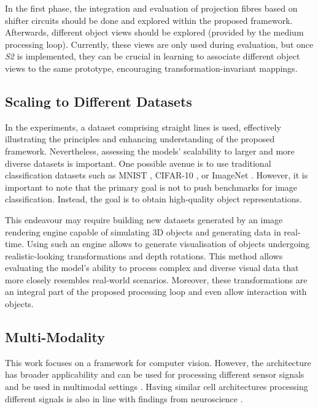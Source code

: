 In the first phase, the integration and evaluation of projection fibres based on shifter circuits \cite{anderson_shifter_1987, olshausen_neurobiological_1993} should be done and explored within the proposed framework.
Afterwards, different object views should be explored (provided by the medium processing loop). Currently, these views are only used during evaluation, but once \emph{S2} is implemented, they can be crucial in learning to associate different object views to the same prototype, encouraging transformation-invariant mappings.


\subsection{Scaling to Different Datasets}
In the experiments, a dataset comprising straight lines is used, effectively illustrating the principles and enhancing understanding of the proposed framework.
Nevertheless, assessing the models' scalability to larger and more diverse datasets is important.
One possible avenue is to use traditional classification datasets such as MNIST , CIFAR-10 , or ImageNet .
However, it is important to note that the primary goal is not to push benchmarks for image classification.
Instead, the goal is to obtain high-quality object representations.

This endeavour may require building new datasets generated by an image rendering engine capable of simulating 3D objects and generating data in real-time.
Using such an engine allows to generate visualisation of objects undergoing realistic-looking transformations and depth rotations.
This method allows evaluating the model's ability to process complex and diverse visual data that more closely resembles real-world scenarios.
Moreover, these transformations are an integral part of the proposed processing loop and even allow interaction with objects.



\subsection{Multi-Modality}
This work focuses on a framework for computer vision. However, the architecture has broader applicability and can be used for processing different sensor signals and be used in multimodal settings .
Having similar cell architectures processing different signals is also in line with findings from neuroscience .

